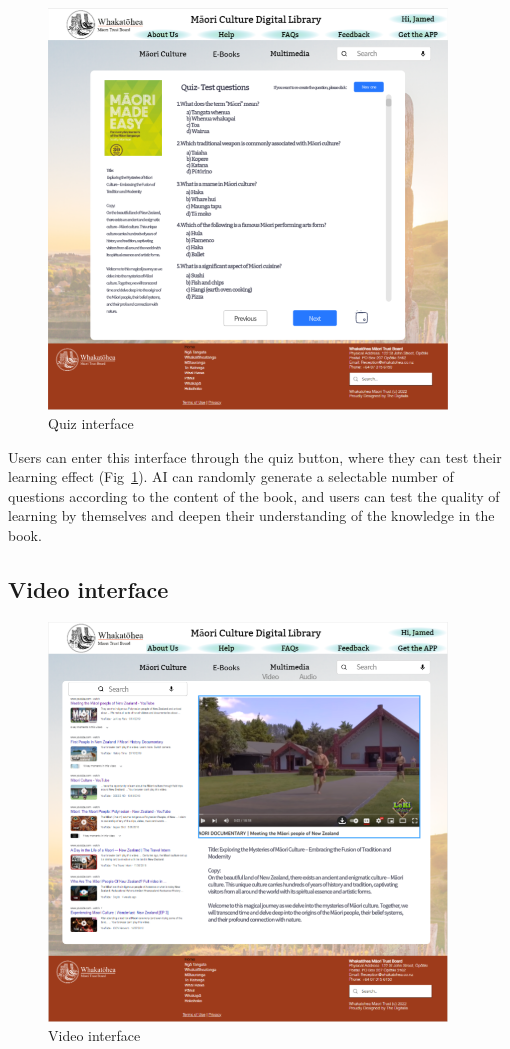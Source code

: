 \begin{figure}[htbp]
  \centerline{\includegraphics[width=300pt]{images/3-2-4.png}}
  \caption{Quiz interface}
  \label{fig3.2.4}
\end{figure}

Users can enter this interface through the quiz button, where they can test their learning effect (Fig~\ref{fig3.2.4}). AI can randomly generate a selectable number of questions according to the content of the book, and users can test the quality of learning by themselves and deepen their understanding of the knowledge in the book.

\subsection{Video interface}

\begin{figure}[htbp]
  \centerline{\includegraphics[width=300pt]{images/3-3-1.png}}
  \caption{Video interface}
  \label{fig3.3.1}
\end{figure}


